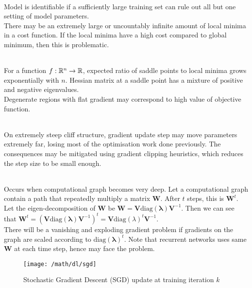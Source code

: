 \begin{remark} \\
Model is identifiable if a sufficiently large training set can rule out all but one setting of model parameters.\\
There may be an extremely large or uncountably infinite amount of local minima in a cost function. If the local minima have a high cost compared to global minimum, then this is problematic.
\end{remark}

\begin{remark} \\
For a function $f: \mathbb{R}^n \rightarrow \mathbb{R}$, expected ratio of saddle points to local minima grows exponentially with $n$. Hessian matrix at a saddle point has a mixture of positive and negative eigenvalues.\\
Degenerate regions with flat gradient may correspond to high value of objective function.
\end{remark}

\begin{remark} \\
On extremely steep cliff structure, gradient update step may move parameters extremely far, losing most of the optimisation work done previously. The consequences may be mitigated using gradient clipping heuristics, which reduces the step size to be small enough.
\end{remark}

\begin{remark} \\
Occurs when computational graph becomes very deep. Let a computational graph contain a path that repeatedly multiply a matrix $\bm{W}$. After $t$ steps, this is $\bm{W}^t$. Let the eigen-decomposition of $\bm{W}$ be $\bm{W} = \bm{V} \text{diag}(\bm{\lambda}) \bm{V}^{-1}$. Then we can see that $\bm{W}^t = (\bm{V} \text{diag}(\bm{\lambda}) \bm{V}^{-1})^t = \bm{V} \text{diag}(\lambda)^t \bm{V}^{-1}$.\\
There will be a vanishing and exploding gradient problem if gradients on the graph are scaled according to $\text{diag}(\bm{\lambda})^t$.  Note that recurrent networks uses same $\bm{W}$ at each time step, hence may face the problem.
\end{remark}

\begin{figure}[H]
\centering
\texttt{[image: /math/dl/sgd]}
\caption{Stochastic Gradient Descent (SGD) update at training iteration $k$}
\end{figure}

